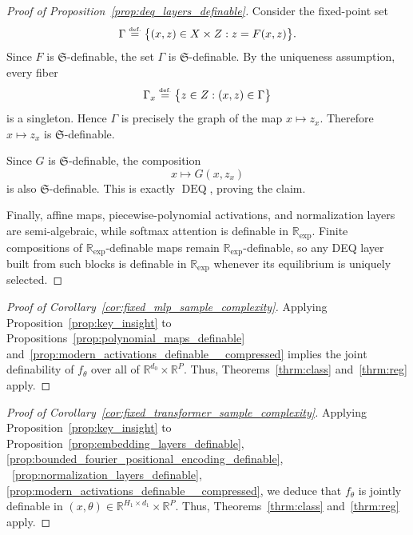 \documentclass{article}
\newcommand{\eqdef}{\ensuremath{\stackrel{\mbox{\upshape\tiny def.}}{=}}}
\theoremstyle{plain}
\theoremstyle{definition}
\theoremstyle{remark}
\theoremstyle{plain}
\numberwithin{thm}{section}
\theoremstyle{definition}
\numberwithin{equation}{section}
\begin{document}
\begin{proof}[{Proof of Proposition~\ref{prop:deq_layers_definable}}]
Consider the fixed-point set
\[
    \Gamma
    \eqdef
        \big\{
            (x,z)\in X\times Z:
            z=F(x,z)
        \big\}.
\]
Since $F$ is $\mathfrak{S}$-definable, the set $\Gamma$ is
$\mathfrak{S}$-definable.  By the uniqueness assumption, every fiber
\[
    \Gamma_x
    \eqdef
        \big\{
            z\in Z:
            (x,z)\in\Gamma
        \big\}
\]
is a singleton.  Hence $\Gamma$ is precisely the graph of the map
$x\mapsto z_x$.  Therefore $x\mapsto z_x$ is $\mathfrak{S}$-definable.

Since $G$ is $\mathfrak{S}$-definable, the composition
\[
    x\mapsto G(x,z_x)
\]
is also $\mathfrak{S}$-definable.  This is exactly
$\operatorname{DEQ}$, proving the claim.

Finally, affine maps, piecewise-polynomial activations, and normalization
layers are semi-algebraic, while softmax attention is definable in
$\mathbb{R}_{\exp}$.  Finite compositions of $\mathbb{R}_{\exp}$-definable
maps remain $\mathbb{R}_{\exp}$-definable, so any DEQ layer built from such
blocks is definable in $\mathbb{R}_{\exp}$ whenever its equilibrium is
uniquely selected.
\end{proof}

\begin{proof}[{Proof of Corollary~\ref{cor:fixed_mlp_sample_complexity}}]
Applying Proposition~\ref{prop:key_insight} to Propositions~\ref{prop:polynomial_maps_definable} and~\ref{prop:modern_activations_definable__compressed} implies the joint definability of $f_{\theta}$ over all of $\mathbb{R}^{d_0}\times \mathbb{R}^{P}$.  
Thus, Theorems~\ref{thrm:class} and~\ref{thrm:reg} apply.
\end{proof}

\begin{proof}[{Proof of Corollary~\ref{cor:fixed_transformer_sample_complexity}}]
Applying Proposition~\ref{prop:key_insight} to Proposition~\ref{prop:embedding_layers_definable}, \ref{prop:bounded_fourier_positional_encoding_definable}, ~\ref{prop:normalization_layers_definable}, \ref{prop:modern_activations_definable__compressed}, we deduce that $f_{\theta}$ is jointly definable in $(x,\theta)\in \mathbb{R}^{H_1\times d_1}\times \mathbb{R}^P$.  Thus, Theorems~\ref{thrm:class} and~\ref{thrm:reg} apply.
\end{proof}



% 
\end{document}

